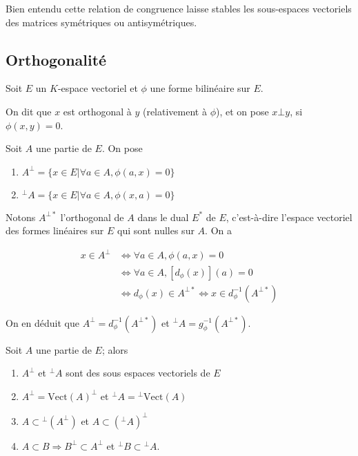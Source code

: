 \begin{rem}
Bien entendu cette relation de congruence laisse stables les sous-espaces vectoriels des matrices symétriques ou antisymétriques.
\end{rem}

\subsection{Orthogonalité}

Soit $E$ un $K$-espace vectoriel et $\phi$ une forme bilinéaire sur $E$.

\begin{de}
On dit que $x$ est orthogonal à $y$ (relativement à $\phi$), et on pose $x \bot y$, si $\phi(x,y) = 0$.
\end{de}

\begin{de}
Soit $A$ une partie de $E$. On pose
\begin{enumerate}
\item $A^\bot = \{x \in E | \forall a \in A, \phi(a,x) = 0\}$
\item ${}^\bot A = \{x \in E | \forall a \in A, \phi(x,a) = 0\}$
\end{enumerate}
\end{de}

\begin{rem}
Notons $A^{\bot *}$ l'orthogonal de $A$ dans le dual $E^*$ de $E$, c'est-à-dire l'espace vectoriel des formes linéaires sur $E$ qui sont nulles sur $A$. On a

\begin{align*}
x \in A^\bot &\Leftrightarrow \forall a \in A, \phi(a,x) = 0 \\
&\Leftrightarrow \forall a \in A, [d_\phi(x)](a) = 0 \\
&\Leftrightarrow d_\phi(x) \in A^{\bot *} \Leftrightarrow x \in d_\phi^{-1}(A^{\bot *})
\end{align*}

On en déduit que $A^\bot = d_\phi^{-1}(A^{\bot *})$ et ${}^\bot A = g_\phi^{-1}(A^{\bot *})$.
\end{rem}

\begin{prop}
Soit $A$ une partie de $E$; alors
\begin{enumerate}
\item $A^\bot$ et ${}^\bot A$ sont des sous espaces vectoriels de $E$
\item $A^\bot = \mathrm{Vect}(A)^\bot$ et ${}^\bot A = {}^\bot \mathrm{Vect}(A)$
\item $A \subset {}^\bot(A^\bot)$ et $A \subset ({}^\bot A)^\bot$
\item $A \subset B \Rightarrow B^\bot \subset A^\bot$ et ${}^\bot B \subset {}^\bot A$.
\end{enumerate}
\end{prop}

